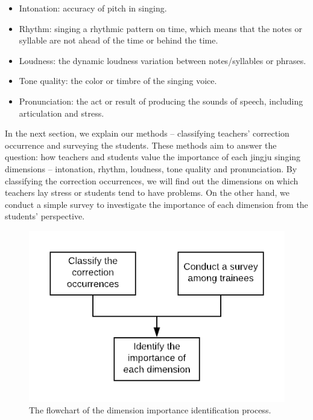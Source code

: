 \begin{itemize}
	\item Intonation: accuracy of pitch in singing.
	\item Rhythm: singing a rhythmic pattern on time, which means that the notes or syllable are not ahead of the time or behind the time.
	\item Loudness: the dynamic loudness variation between notes/syllables or phrases.
	\item Tone quality: the color or timbre of the singing voice.
	\item Pronunciation: the act or result of producing the sounds of speech, including articulation and stress.
\end{itemize}

In the next section, we explain our methods -- classifying teachers' correction occurrence and surveying the students. These methods aim to answer the question: how teachers and students value the importance of each jingju singing dimensions -- intonation, rhythm, loudness, tone quality and pronunciation. By classifying the correction occurrences, we will find out the dimensions on which teachers lay stress or students tend to have problems. On the other hand, we conduct a simple survey to investigate the importance of each dimension from the students' perspective.

\begin{figure}[ht!]
\includegraphics[width=\textwidth]{figs/blockDiags_rong/ch3_occurrance_analysis_flow.png}
\caption{The flowchart of the dimension importance identification process.}
\label{fig:ch3_occurrance_analysis_flow}
\end{figure}

